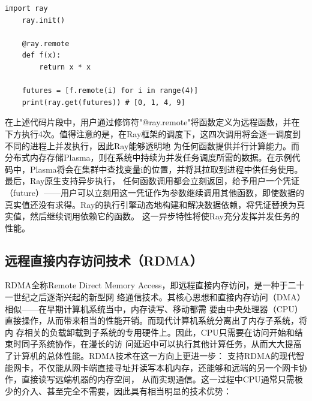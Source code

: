 \begin{minipage}{\linewidth}
\begin{lstlisting}[style=sysupython, caption=Ray代码示例]
	import ray
	ray.init()
	
	@ray.remote
	def f(x):
	    return x * x
	
	futures = [f.remote(i) for i in range(4)]
	print(ray.get(futures)) # [0, 1, 4, 9]
\end{lstlisting}
\end{minipage}

在上述代码片段中，用户通过修饰符"@ray.remote"将函数定义为远程函数，并在下方执行4次。值得注意的是，在Ray框架的调度下，这四次调用将会逐一调度到不同的进程上并发执行，因此Ray能够透明地
为任何函数提供并行计算能力。而分布式内存存储Plasma，则在系统中持续为并发任务调度所需的数据。在示例代码中，Plasma将会在集群中查找变量i的位置，并将其拉取到进程中供任务使用。最后，Ray原生支持异步执行，
任何函数调用都会立刻返回，给予用户一个凭证（future\cite{wang2021ownership}）——用户可以立刻用这一凭证作为参数继续调用其他函数，即使数据的真实值还没有求得。Ray的执行引擎动态地构建和解决数据依赖，将凭证替换为真实值，然后继续调用依赖它的函数。
这一异步特性将使Ray充分发挥并发任务的性能。

\subsection{远程直接内存访问技术（RDMA）}

RDMA全称Remote Direct Memory Access，即远程直接内存访问，是一种于二十一世纪之后逐渐兴起的新型网
络通信技术。其核心思想和直接内存访问（DMA）相似——在早期计算机系统当中，内存读写、移动都需
要由中央处理器（CPU）直接操作，从而带来相当的性能开销。而现代计算机系统分离出了内存子系统，将内
存相关的负载卸载到子系统的专用硬件上。因此，CPU只需要在访问开始和结束时同子系统协作，在漫长的访
问延迟中可以执行其他计算任务，从而大大提高了计算机的总体性能。RDMA技术在这一方向上更进一步：
支持RDMA的现代智能网卡，不仅能从网卡端直接寻址并读写本机内存，还能够和远端的另一个网卡协作，直接读写远端机器的内存空间，
从而实现通信。这一过程中CPU通常只需极少的介入、甚至完全不需要，因此具有相当明显的技术优势：

